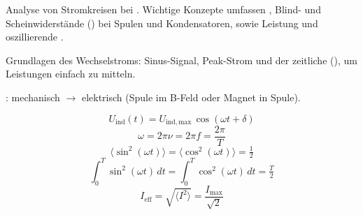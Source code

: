 

\begin{runintext}
Analyse von Stromkreisen bei . Wichtige Konzepte umfassen , Blind- und Scheinwiderstände () bei Spulen und Kondensatoren, sowie Leistung und oszillierende .
\end{runintext}

\begin{runintext}
Grundlagen des Wechselstroms: Sinus-Signal, Peak-Strom und der zeitliche  (), um Leistungen einfach zu mitteln.
\end{runintext}
\begin{runintext}
: mechanisch $\to$ elektrisch (Spule im B-Feld oder Magnet in Spule).
\end{runintext}


\begin{formulabox}
\[ U_{\mathrm{ind}}(t) = U_{\mathrm{ind},\mathrm{max}}\,\cos(\omega t + \delta) \]
\[ \omega = 2\pi\nu = 2\pi f = \frac{2\pi}{T} \]
\formulasep
\[ \langle \sin^2(\omega t)\rangle = \langle \cos^2(\omega t)\rangle = \tfrac{1}{2} \]
\[ \int_0^T \sin^2(\omega t)\,dt = \int_0^T \cos^2(\omega t)\,dt = \tfrac{T}{2} \]
\formulasep
\[ I_{\mathrm{eff}} = \sqrt{\langle I^2\rangle} = \frac{I_{\max}}{\sqrt{2}} \]
\end{formulabox}

